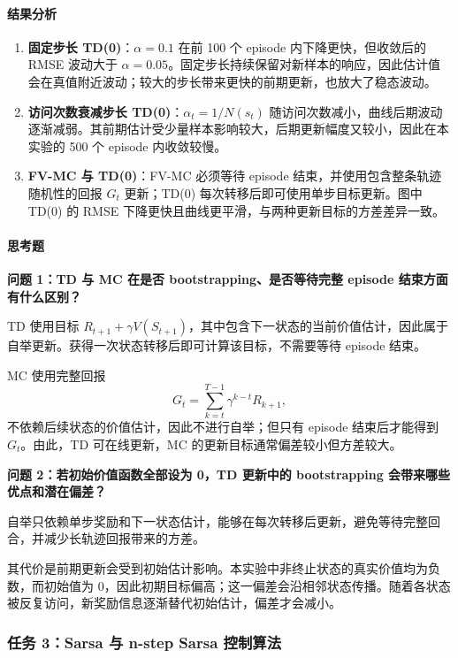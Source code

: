 \documentclass[11pt,a4paper,UTF8]{ctexart}
\numberwithin{figure}{section}
\numberwithin{table}{section}
\newcommand{\answerlabel}{%
  \par\smallskip\noindent{\heiti\bfseries 回答：}\quad}
\newcommand{\question}[1]{\par\smallskip\noindent\textbf{#1}\par}
\begin{document}
\paragraph{结果分析}
\begin{enumerate}
\item \textbf{固定步长 TD(0)}：$\alpha=0.1$ 在前 100 个 episode 内下降更快，但收敛后的 RMSE 波动大于 $\alpha=0.05$。固定步长持续保留对新样本的响应，因此估计值会在真值附近波动；较大的步长带来更快的前期更新，也放大了稳态波动。
\item \textbf{访问次数衰减步长 TD(0)}：$\alpha_t=1/N(s_t)$ 随访问次数减小，曲线后期波动逐渐减弱。其前期估计受少量样本影响较大，后期更新幅度又较小，因此在本实验的 500 个 episode 内收敛较慢。
\item \textbf{FV-MC 与 TD(0)}：FV-MC 必须等待 episode 结束，并使用包含整条轨迹随机性的回报 $G_t$ 更新；TD(0) 每次转移后即可使用单步目标更新。图中 TD(0) 的 RMSE 下降更快且曲线更平滑，与两种更新目标的方差差异一致。
\end{enumerate}

\paragraph{思考题}


\question{问题 1：TD 与 MC 在是否 bootstrapping、是否等待完整 episode 结束方面有什么区别？}

\answerlabel TD 使用目标 $R_{t+1}+\gamma V(S_{t+1})$，其中包含下一状态的当前价值估计，因此属于自举更新。获得一次状态转移后即可计算该目标，不需要等待 episode 结束。

MC 使用完整回报
\[
G_t=\sum_{k=t}^{T-1}\gamma^{k-t}R_{k+1},
\]
不依赖后续状态的价值估计，因此不进行自举；但只有 episode 结束后才能得到 $G_t$。由此，TD 可在线更新，MC 的更新目标通常偏差较小但方差较大。


\question{问题 2：若初始价值函数全部设为 0，TD 更新中的 bootstrapping 会带来哪些优点和潜在偏差？}

\answerlabel 自举只依赖单步奖励和下一状态估计，能够在每次转移后更新，避免等待完整回合，并减少长轨迹回报带来的方差。

其代价是前期更新会受到初始估计影响。本实验中非终止状态的真实价值均为负数，而初始值为 0，因此初期目标偏高；这一偏差会沿相邻状态传播。随着各状态被反复访问，新奖励信息逐渐替代初始估计，偏差才会减小。


\subsubsection{任务 3：Sarsa 与 n-step Sarsa 控制算法}
\end{document}
